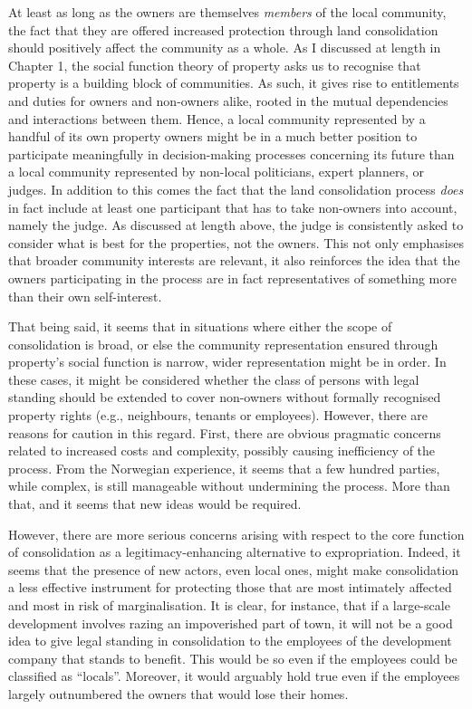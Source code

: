 At least as long as the owners are themselves {\it members} of the local community, the fact that they are offered increased protection through land consolidation should positively affect the community as a whole. As I discussed at length in Chapter 1, the social function theory of property asks us to recognise that property is a building block of communities. As such, it gives rise to entitlements and duties for owners and non-owners alike, rooted in the mutual dependencies and interactions between them. Hence, a local community represented by a handful of its own property owners might be in a much better position to participate meaningfully in decision-making processes concerning its future than a local community represented by non-local politicians, expert planners, or judges. In addition to this comes the fact that the land consolidation process {\it does} in fact include at least one participant that has to take non-owners into account, namely the judge. As discussed at length above, the judge is consistently asked to consider what is best for the properties, not the owners. This not only emphasises that broader community interests are relevant, it also reinforces the idea that the owners participating in the process are in fact representatives of something more than their own self-interest.

That being said, it seems that in situations where either the scope of consolidation is broad, or else the community representation ensured through property's social function is narrow, wider representation might be in order. In these cases, it might be considered whether the class of persons with legal standing should be extended to cover non-owners without formally recognised property rights (e.g., neighbours, tenants or employees). However, there are reasons for caution in this regard. First, there are obvious pragmatic concerns related to increased costs and complexity, possibly causing inefficiency of the process. From the Norwegian experience, it seems that a few hundred parties, while complex, is still manageable without undermining the process. More than that, and it seems that new ideas would be required. 

However, there are more serious concerns arising with respect to the core function of consolidation as a legitimacy-enhancing alternative to expropriation. Indeed, it seems that the presence of new actors, even local ones, might make consolidation a less effective instrument for protecting those that are most intimately affected and most in risk of marginalisation. It is clear, for instance, that if a large-scale development involves razing an impoverished part of town, it will not be a good idea to give legal standing in consolidation to the employees of the development company that stands to benefit. This would be so even if the employees could be classified as ``locals''. Moreover, it would arguably hold true even if the employees largely outnumbered the owners that would lose their homes. 
 
